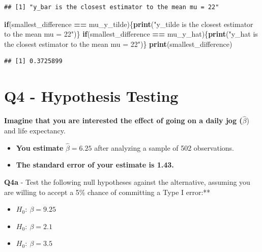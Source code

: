 \documentclass[
]{article}
\newenvironment{Shaded}{\begin{snugshade}}{\end{snugshade}}
\newcommand{\ControlFlowTok}[1]{\textcolor[rgb]{0.13,0.29,0.53}{\textbf{#1}}}
\newcommand{\FunctionTok}[1]{\textcolor[rgb]{0.13,0.29,0.53}{\textbf{#1}}}
\newcommand{\NormalTok}[1]{#1}
\newcommand{\SpecialCharTok}[1]{\textcolor[rgb]{0.81,0.36,0.00}{\textbf{#1}}}
\newcommand{\StringTok}[1]{\textcolor[rgb]{0.31,0.60,0.02}{#1}}
\begin{document}
\begin{verbatim}
## [1] "y_bar is the closest estimator to the mean mu = 22"
\end{verbatim}

\begin{Shaded}
\begin{Highlighting}[]
\ControlFlowTok{if}\NormalTok{(smallest\_difference }\SpecialCharTok{==}\NormalTok{ mu\_y\_tilde)\{}\FunctionTok{print}\NormalTok{(}\StringTok{"y\_tilde is the closest estimator to the mean mu = 22"}\NormalTok{)\}}
\ControlFlowTok{if}\NormalTok{(smallest\_difference }\SpecialCharTok{==}\NormalTok{ mu\_y\_hat)\{}\FunctionTok{print}\NormalTok{(}\StringTok{"y\_hat is the closest estimator to the mean mu = 22"}\NormalTok{)\}}
\FunctionTok{print}\NormalTok{(smallest\_difference)}
\end{Highlighting}
\end{Shaded}

\begin{verbatim}
## [1] 0.3725899
\end{verbatim}

\hfill\break
\hfill\break

\hypertarget{q4---hypothesis-testing}{%
\section{Q4 - Hypothesis Testing}\label{q4---hypothesis-testing}}

\textbf{Imagine that you are interested the effect of going on a daily
jog (}\(\hat{\beta}\)) and life expectancy.

\begin{itemize}
\item
  \textbf{You estimate} \(\hat{\beta} = 6.25\) after analyzing a sample
  of 502 observations.
\item
  \textbf{The standard error of your estimate is 1.43.}
\end{itemize}

\hfill\break

\textbf{Q4a} - Test the following null hypotheses against the
alternative, assuming you are willing to accept a 5\% chance of
committing a Type I error:**

\hfill\break

\begin{itemize}
\item
  \(H_0: \: \beta=9.25\)
\item
  \(H_0: \: \beta=2.1\)
\item
  \(H_0: \: \beta=3.5\)
\end{itemize}
\end{document}
